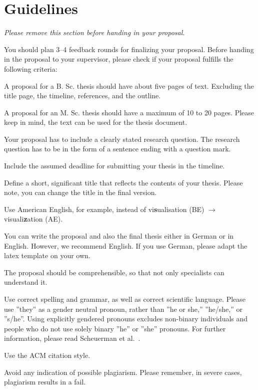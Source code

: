 \pagecolor{fu-orange}

\section*{Guidelines}
\emph{Please remove this section before handing in your proposal.}

You should plan 3--4 feedback rounds for finalizing your proposal.
Before handing in the proposal to your supervisor, please check if your proposal fulfills the following criteria:

\begin{todolist}
  \item A proposal for a B. Sc. thesis should have about five pages of text. Excluding the title page, the timeline, references, and the outline.
  \item A proposal for an M. Sc. thesis should have a maximum of 10 to 20 pages. Please keep in mind, the text can be used for the thesis document. 
  \item Your proposal has to include a clearly stated research question. The research question has to be in the form of a sentence ending with a question mark.
  \item Include the assumed deadline for submitting your thesis in the timeline.
  \item Define a short, significant title that reflects the contents of your thesis. Please note, you can change the title in the final version.
  \item Use American English, for example, instead of vi\textbf{s}ualisation (BE) $\rightarrow$ visuali\textbf{z}ation (AE).
  \item You can write the proposal and also the final thesis either in German or in English. However, we recommend English. If you use German, please adapt the latex template on your own.
  \item The proposal should be comprehensible, so that not only specialists can understand it.
  \item Use correct spelling and grammar, as well as correct scientific language. Please use ''they'' as a gender neutral pronoun, rather than ''he or she,'' ''he/she,'' or ''s/he''. Using explicitly gendered pronouns excludes non-binary individuals and people who do not use solely binary ''he'' or ''she'' pronouns. For further information, please read Scheuerman et al.~\cite{scheuerman2020:hcigenderguidelines}.
  \item Use the ACM citation style.
  \item Avoid any indication of possible plagiarism. Please remember, in severe cases, plagiarism results in a fail.
 
\end{todolist}

